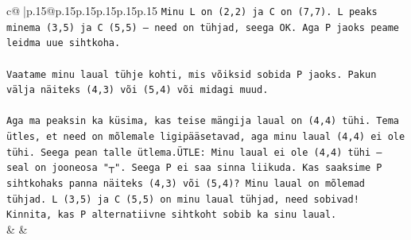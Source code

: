 \documentclass{article}
\begin{document}
{\begin{supertabular}{c@{$\;$}|p{.15\linewidth}@{}p{.15\linewidth}p{.15\linewidth}p{.15\linewidth}p{.15\linewidth}p{.15\linewidth}}
{{{\texttt{Minu L on (2,2) ja C on (7,7). L peaks minema (3,5) ja C (5,5) — need on tühjad, seega OK. Aga P jaoks peame leidma uue sihtkoha.} \\
\\ 
\texttt{Vaatame minu laual tühje kohti, mis võiksid sobida P jaoks. Pakun välja näiteks (4,3) või (5,4) või midagi muud.} \\
\\ 
\texttt{Aga ma peaksin ka küsima, kas teise mängija laual on (4,4) tühi. Tema ütles, et need on mõlemale ligipääsetavad, aga minu laual (4,4) ei ole tühi. Seega pean talle ütlema.ÜTLE: Minu laual ei ole (4,4) tühi — seal on jooneosa "┬". Seega P ei saa sinna liikuda. Kas saaksime P sihtkohaks panna näiteks (4,3) või (5,4)? Minu laual on mõlemad tühjad. L (3,5) ja C (5,5) on minu laual tühjad, need sobivad! Kinnita, kas P alternatiivne sihtkoht sobib ka sinu laual.} \\
            }
        }
    }
    & & \\ \\


\end{supertabular}}
\end{document}

